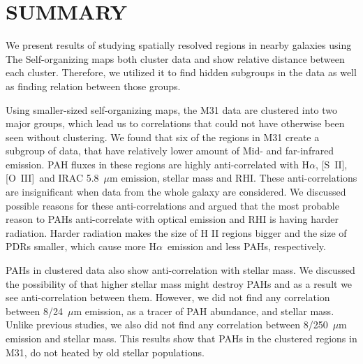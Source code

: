 \documentclass[useAMS,usenatbib]{mn2e}
\newcommand \halpha    {H$\alpha $}
\newcommand \sii {[S~{\textsc II}]}
\newcommand \oiii {[O~{\textsc III}]}
\begin{document}

\section{SUMMARY}
\label{sec: summary}

We present results of studying spatially resolved regions in nearby galaxies using 
The Self-organizing maps both cluster data and show relative distance between each cluster. 
Therefore, we utilized it to find hidden subgroups in the data as well as finding relation between those groups.

Using smaller-sized self-organizing maps, the M31 data are clustered into two major groups, which lead us to correlations that could not have otherwise been seen without clustering.
We found that six of the regions in M31 create a subgroup of data, that have relatively lower amount of Mid- and far-infrared emission.
PAH fluxes in these regions are highly anti-correlated with \halpha, \sii, \oiii~and IRAC 5.8~$\mu$m emission, stellar mass and RHI.
These anti-correlations are insignificant when data from the whole galaxy are considered.
We discussed possible reasons for these anti-correlations and argued that the most probable reason to PAHs anti-correlate with optical emission and RHI is having harder radiation.
Harder radiation makes the size of H {\sc II} regions bigger and the size of PDRs smaller, which cause more \halpha~emission and less PAHs, respectively.

PAHs in clustered data also show anti-correlation with stellar mass.
We discussed the possibility of that higher stellar mass might destroy PAHs and as a result we see anti-correlation between them.
However, we did not find any correlation between 8/24~$\mu$m emission, as a tracer of PAH abundance, and stellar mass.
Unlike previous studies, we also did not find any correlation between 8/250~$\mu$m emission and stellar mass. 
This results show that PAHs in the clustered regions in M31, do not heated by old stellar populations.
\end{document}
